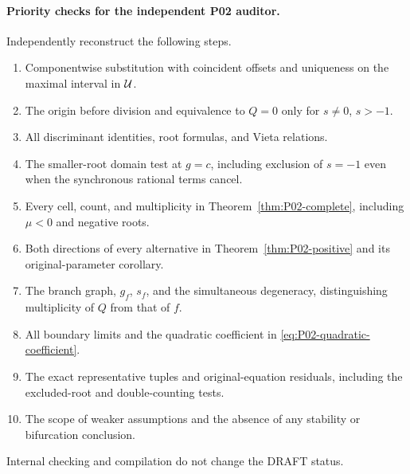 \paragraph{Priority checks for the independent P02 auditor.}
Independently reconstruct the following steps.
\begin{enumerate}[label=(\arabic*),leftmargin=*]
\item Componentwise substitution with coincident offsets and uniqueness
on the maximal interval in $\mathcal{U}$.
\item The origin before division and equivalence to $Q=0$ only for
$s\ne0$, $s>-1$.
\item All discriminant identities, root formulas, and Vieta relations.
\item The smaller-root domain test at $g=c$, including exclusion of
$s=-1$ even when the synchronous rational terms cancel.
\item Every cell, count, and multiplicity in
Theorem~\ref{thm:P02-complete}, including $\mu<0$ and negative roots.
\item Both directions of every alternative in
Theorem~\ref{thm:P02-positive} and its original-parameter corollary.
\item The branch graph, $g_f$, $s_f$, and the simultaneous degeneracy,
distinguishing multiplicity of $Q$ from that of $f$.
\item All boundary limits and the quadratic coefficient in
\eqref{eq:P02-quadratic-coefficient}.
\item The exact representative tuples and original-equation residuals,
including the excluded-root and double-counting tests.
\item The scope of weaker assumptions and the absence of any stability
or bifurcation conclusion.
\end{enumerate}
Internal checking and compilation do not change the DRAFT status.
